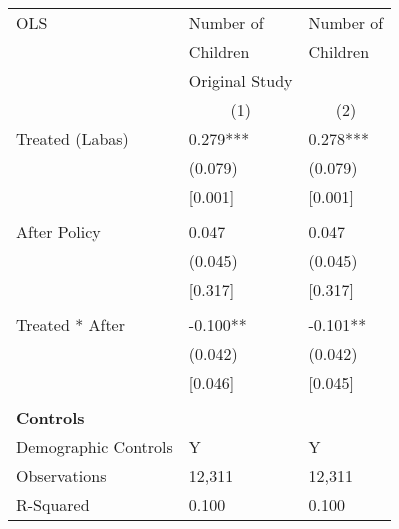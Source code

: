 \begin{tabular}{p{4cm}p{1.5cm}p{1.5cm}}
\hline\hline
OLS               &Number of & Number of \\
&Children & Children \\
&Original Study &  \\
&\multicolumn{1}{c}{(1)}&\multicolumn{1}{c}{(2)}\\
\hline
Treated (Labas)   &   0.279***&   0.278***\\
                &  (0.079)&  (0.079)\\
								 &  [0.001]&  [0.001]\\
                \\
After Policy   &   0.047&   0.047\\
                &  (0.045)&  (0.045)\\
													 &  [0.317]&  [0.317]\\
                \\
Treated * After   &  -0.100**&  -0.101**\\
                &  (0.042)&  (0.042)\\
													 &  [0.046]&  [0.045]\\
                \\

\multicolumn{3}{l}{\textbf{Controls}}  \\                  
Demographic Controls       &    Y     &        Y\\

\hline
Observations    &    12,311&    12,311\\
R-Squared    &  0.100   & 0.100     \\
\hline\hline
\end{tabular}